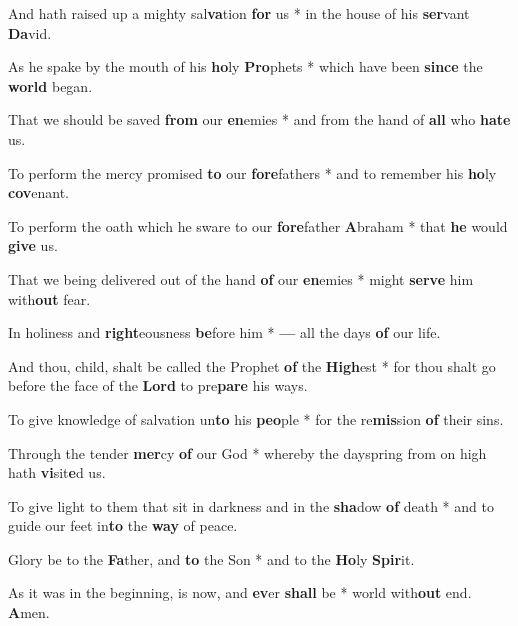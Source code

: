\begin{multicols}{2}
	And hath raised up a mighty sal\textbf{va}tion \textbf{for} us * in the house of his \textbf{ser}vant \textbf{Da}vid.
	
	As he spake by the mouth of his \textbf{ho}ly \textbf{Pro}phets * which have been \textbf{since} the \textbf{world} began.
	
	That we should be saved \textbf{from} our \textbf{en}emies * and from the hand of \textbf{all} who \textbf{hate} us.
	
	To perform the mercy promised \textbf{to} our \textbf{fore}fathers * and to remember his \textbf{ho}ly \textbf{cov}enant. 
	
	To perform the oath which he sware to our \textbf{fore}father \textbf{A}braham * that \textbf{he} would \textbf{give} us.
	
	That we being delivered out of the hand \textbf{of} our \textbf{en}emies * might \textbf{serve} him with\textbf{out} fear.
	
	In holiness and \textbf{right}eousness \textbf{be}fore him * \textbf{---} all the days \textbf{of} our life.
	
	And thou, child, shalt be called the Prophet \textbf{of} the \textbf{High}est * for thou shalt go before the face of the \textbf{Lord} to pre\textbf{pare} his ways.
	
	To give knowledge of salvation un\textbf{to} his \textbf{peo}ple * for the re\textbf{mis}sion \textbf{of} their sins.
	
	Through the tender \textbf{mer}cy \textbf{of} our God * whereby the dayspring from on high hath \textbf{vi}sit\textbf{e}d us.
	
	To give light to them that sit in darkness and in the \textbf{sha}dow \textbf{of} death * and to guide our feet in\textbf{to} the \textbf{way} of peace.
	
	Glory be to the \textbf{Fa}ther, and \textbf{to} the Son * and to the \textbf{Ho}ly \textbf{Spir}it.
	
	As it was in the beginning, is now, and \textbf{ev}er \textbf{shall} be * world with\textbf{out} end. \textbf{A}men.
\end{multicols}
